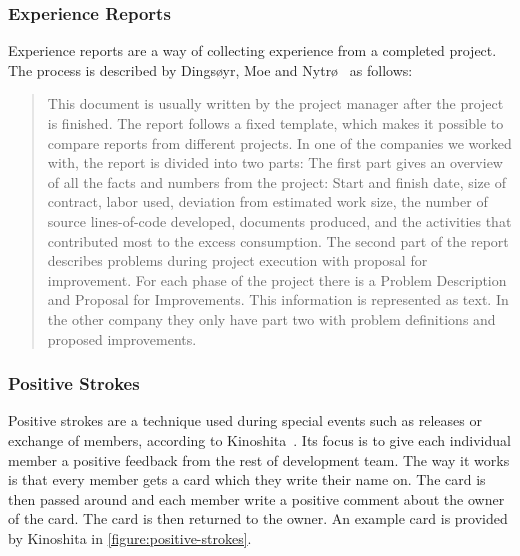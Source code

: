 \documentclass[12pt]{article}
\begin{document}
\subsubsection{Experience Reports}\label{experience-reports}
Experience reports are a way of collecting experience from a completed project. The process is described by Dingsøyr, Moe and Nytrø~\cite{Moe2001} as follows: 

\begin{quote} This document is usually written by the project manager after the project is
finished. The report follows a fixed template, which makes it possible to compare
reports from different projects. In one of the companies we worked with, the report is
divided into two parts: The first part gives an overview of all the facts and numbers
from the project: Start and finish date, size of contract, labor used, deviation from
estimated work size, the number of source lines-of-code developed, documents
produced, and the activities that contributed most to the excess consumption. The
second part of the report describes problems during project execution with proposal
for improvement. For each phase of the project there is a Problem Description and
Proposal for Improvements. This information is represented as text. In the other
company they only have part two with problem definitions and proposed
improvements.
\end{quote}


\subsubsection{Positive Strokes}
Positive strokes are a technique used during special events such as releases or exchange of members, according to Kinoshita~\cite{Kinoshita2008}. Its focus is to give each individual member a positive feedback from the rest of development team. The way it works is that every member gets a card which they write their name on. The card is then passed around and each member write a positive comment about the owner of the card. The card is then returned to the owner. An example card is provided by Kinoshita in \autoref{figure:positive-strokes}.
\end{document}
